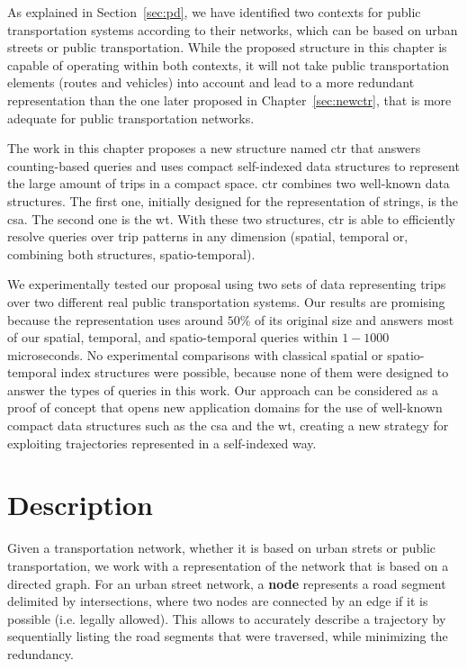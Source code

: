 	As explained in Section~\ref{sec:pd}, we have identified two contexts for public transportation systems according to their networks, which can be based on urban streets or public transportation. While the proposed structure in this chapter is capable of operating within both contexts, it will not take public transportation elements (routes and vehicles) into account and lead to a more redundant representation than the one later proposed in Chapter~\ref{sec:newctr}, that is more adequate for public transportation networks.
	
	The work in this chapter proposes a new structure named \gls{ctr} that answers  counting-based queries and uses compact self-indexed data structures to represent the large amount of trips in a compact space.
	\gls{ctr} combines two well-known data structures. The first one,
	initially designed for the representation of strings, is the
	\gls{csa}. The second
	one is the \gls{wt}. With these two structures, \gls{ctr} is able to efficiently resolve queries over trip patterns in any dimension (spatial, temporal or, combining both structures, spatio-temporal).

	We experimentally tested our proposal using two sets of %
	data representing trips over two different real public
	transportation systems. Our results are promising because the
	representation uses around  $50$\% of its original size and
	answers most of our spatial, temporal,  and spatio-temporal queries within $1\!-\!1000$ microseconds. 
	No experimental comparisons with classical spatial or spatio-temporal
	index structures were possible, because none of them were designed to
	answer the types of queries in this work. Our approach can  be
	considered as a proof of concept that opens new application
	domains for the use of well-known compact data structures such as the
	\gls{csa} and the \gls{wt}, creating a new strategy for
	exploiting trajectories represented in a self-indexed way.

\section{Description}
    Given a transportation network, whether it is based on urban strets or public transportation, we work with a representation of the network that is based on a directed graph. For an urban street network, a \textbf{node} represents a road segment delimited by intersections, where two nodes are connected by an edge if it is possible (i.e. legally allowed). This allows to accurately describe a trajectory by sequentially listing the road segments that were traversed, while minimizing the redundancy.

